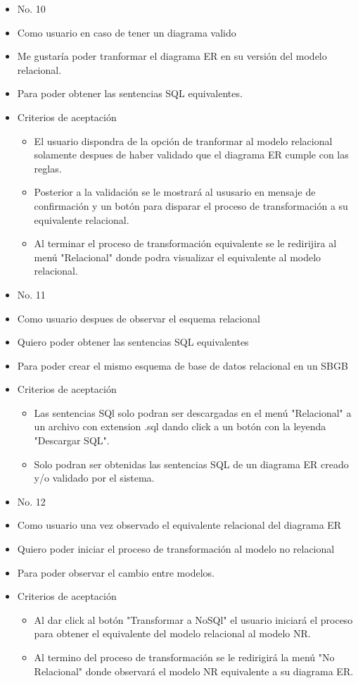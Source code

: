 \hline
\begin{itemize}
	\item No. 10
	\item Como usuario en caso de tener un diagrama valido
	\item Me gustaría poder tranformar el diagrama ER en su versión del modelo relacional.
	\item Para poder obtener las sentencias SQL equivalentes.
	\item Criterios de aceptación
	\begin{itemize}
		\item El usuario dispondra de la opción de tranformar al modelo relacional solamente despues de haber validado que el diagrama ER cumple con las reglas.
		\item Posterior a la validación se le mostrará al ususario en mensaje de confirmación y un botón para disparar el proceso de transformación a su equivalente relacional.
		\item Al terminar el proceso de transformación equivalente se le redirijira al menú "Relacional" donde podra visualizar el equivalente al modelo relacional.
	\end{itemize}
\end{itemize}
\hline
\begin{itemize}
	\item No. 11
	\item Como usuario despues de observar el esquema relacional
	\item Quiero poder obtener las sentencias SQL equivalentes
	\item Para poder crear el mismo esquema de base de datos relacional en un SBGB
	\item Criterios de aceptación
	\begin{itemize}
		\item Las sentencias SQl solo podran ser descargadas en el menú "Relacional" a un archivo con extension .sql dando click a un botón con la leyenda "Descargar SQL".
		\item Solo podran ser obtenidas las sentencias SQL de un diagrama ER creado y/o validado por el sistema.
	\end{itemize}
\end{itemize}
\hline
\begin{itemize}
	\item No. 12
	\item Como usuario una vez observado el equivalente relacional del diagrama ER
	\item Quiero poder iniciar el proceso de transformación al modelo no relacional
	\item Para poder observar el cambio entre modelos.
	\item Criterios de aceptación
	\begin{itemize}
		\item Al dar click al botón "Transformar a NoSQl" el usuario iniciará el proceso para obtener el equivalente del modelo relacional al modelo NR.
		\item Al termino del proceso de transformación se le redirigirá la menú "No Relacional" donde observará el modelo NR equivalente a su diagrama ER.
	\end{itemize}
\end{itemize}
